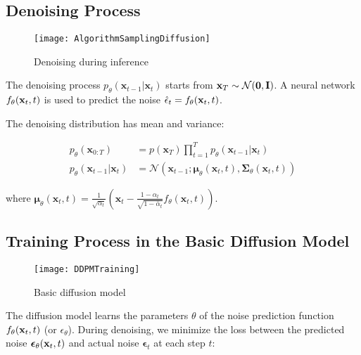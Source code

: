 \subsection{Denoising Process}
\label{subsection:denoising_process}

\begin{figure}[H]
	\centering
	\texttt{[image: AlgorithmSamplingDiffusion]}
	\caption{Denoising during inference}
	\label{fig:AlgorithmSamplingDiffusion}
	\vspace{-5pt}
\end{figure}

The denoising process $p_\theta(\mathbf{x}_{t-1} \vert \mathbf{x}_t)$ starts from $\mathbf{x}_T \sim \mathcal{N}(\mathbf{0}, \mathbf{I})$. A neural network $f_{\theta}(\mathbf{x}_t, t)$ is used to predict the noise $\hat{\epsilon}_t = f_{\theta}(\mathbf{x}_t, t)$.

The denoising distribution has mean and variance:

\begin{equation}
	\label{eq:denoising_process}
	\begin{aligned}
		p_\theta(\mathbf{x}_{0:T})
		&= p(\mathbf{x}_T) \prod^T_{t=1} p_\theta(\mathbf{x}_{t-1} \vert \mathbf{x}_t) \\
		p_\theta(\mathbf{x}_{t-1} \vert \mathbf{x}_t) &= \mathcal{N}(\mathbf{x}_{t-1};  \boldsymbol{\mu}_\theta(\mathbf{x}_t, t), \boldsymbol{\Sigma}_\theta(\mathbf{x}_t, t))
	\end{aligned}
\end{equation}

where $\boldsymbol{\mu}_\theta(\mathbf{x}_t, t) = {\frac{1}{\sqrt{\alpha_t}} \left( \mathbf{x}_t - \frac{1 - \alpha_t}{\sqrt{1 - \bar{\alpha}_t}}  f_\theta(\mathbf{x}_t, t) \right)}$.

\subsection{Training Process in the Basic Diffusion Model}

\begin{figure}[H]
	\centering
	\texttt{[image: DDPMTraining]}
	\caption{Basic diffusion model}
	\label{fig:basic_diffusion}
	\vspace{-5pt}
\end{figure}

The diffusion model learns the parameters $\theta$ of the noise prediction function $f_{\theta}(\mathbf{x}_t, t)$ (or $\epsilon_\theta$). During denoising, we minimize the loss between the predicted noise $\boldsymbol{\epsilon}_\theta(\mathbf{x}_t, t)$ and actual noise $\boldsymbol{\epsilon}_t$ at each step $t$:

